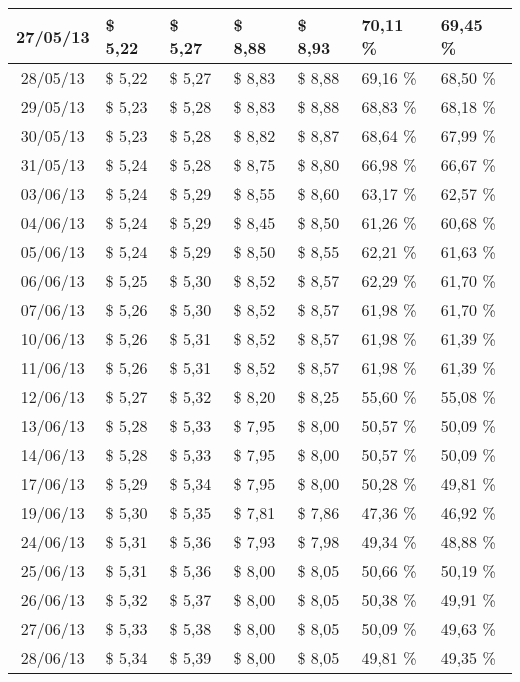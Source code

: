 \begin{center}
\begin{longtable}{|c|p{1.5cm}|p{1.5cm}|p{1.5cm}|p{1.5cm}|p{1.5cm}|p{1.5cm}|}
27/05/13 & \$ 5,22 & \$ 5,27 & \$ 8,88 & \$ 8,93 & 70,11 \% & 69,45 \% \\ \hline
28/05/13 & \$ 5,22 & \$ 5,27 & \$ 8,83 & \$ 8,88 & 69,16 \% & 68,50 \% \\ \hline
29/05/13 & \$ 5,23 & \$ 5,28 & \$ 8,83 & \$ 8,88 & 68,83 \% & 68,18 \% \\ \hline
30/05/13 & \$ 5,23 & \$ 5,28 & \$ 8,82 & \$ 8,87 & 68,64 \% & 67,99 \% \\ \hline
31/05/13 & \$ 5,24 & \$ 5,28 & \$ 8,75 & \$ 8,80 & 66,98 \% & 66,67 \% \\ \hline
03/06/13 & \$ 5,24 & \$ 5,29 & \$ 8,55 & \$ 8,60 & 63,17 \% & 62,57 \% \\ \hline
04/06/13 & \$ 5,24 & \$ 5,29 & \$ 8,45 & \$ 8,50 & 61,26 \% & 60,68 \% \\ \hline
05/06/13 & \$ 5,24 & \$ 5,29 & \$ 8,50 & \$ 8,55 & 62,21 \% & 61,63 \% \\ \hline
06/06/13 & \$ 5,25 & \$ 5,30 & \$ 8,52 & \$ 8,57 & 62,29 \% & 61,70 \% \\ \hline
07/06/13 & \$ 5,26 & \$ 5,30 & \$ 8,52 & \$ 8,57 & 61,98 \% & 61,70 \% \\ \hline
10/06/13 & \$ 5,26 & \$ 5,31 & \$ 8,52 & \$ 8,57 & 61,98 \% & 61,39 \% \\ \hline
11/06/13 & \$ 5,26 & \$ 5,31 & \$ 8,52 & \$ 8,57 & 61,98 \% & 61,39 \% \\ \hline
12/06/13 & \$ 5,27 & \$ 5,32 & \$ 8,20 & \$ 8,25 & 55,60 \% & 55,08 \% \\ \hline
13/06/13 & \$ 5,28 & \$ 5,33 & \$ 7,95 & \$ 8,00 & 50,57 \% & 50,09 \% \\ \hline
14/06/13 & \$ 5,28 & \$ 5,33 & \$ 7,95 & \$ 8,00 & 50,57 \% & 50,09 \% \\ \hline
17/06/13 & \$ 5,29 & \$ 5,34 & \$ 7,95 & \$ 8,00 & 50,28 \% & 49,81 \% \\ \hline
19/06/13 & \$ 5,30 & \$ 5,35 & \$ 7,81 & \$ 7,86 & 47,36 \% & 46,92 \% \\ \hline
24/06/13 & \$ 5,31 & \$ 5,36 & \$ 7,93 & \$ 7,98 & 49,34 \% & 48,88 \% \\ \hline
25/06/13 & \$ 5,31 & \$ 5,36 & \$ 8,00 & \$ 8,05 & 50,66 \% & 50,19 \% \\ \hline
26/06/13 & \$ 5,32 & \$ 5,37 & \$ 8,00 & \$ 8,05 & 50,38 \% & 49,91 \% \\ \hline
27/06/13 & \$ 5,33 & \$ 5,38 & \$ 8,00 & \$ 8,05 & 50,09 \% & 49,63 \% \\ \hline
28/06/13 & \$ 5,34 & \$ 5,39 & \$ 8,00 & \$ 8,05 & 49,81 \% & 49,35 \% \\ \hline

\end{longtable}
\end{center}
